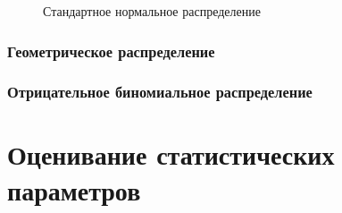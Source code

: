\documentclass[
  letterpaper,
  DIV=11,
  numbers=noendperiod]{scrreprt}
\newcommand{\const}{\text{const}}
\newcommand{\lp}{\left(}
\newcommand{\rp}{\right)}
\newcommand{\lb}{\left[}
\newcommand{\rb}{\right]}
\newcommand*\circled[1]{\tikz[baseline=(char.base)]{
            \node[shape=circle,draw,inner sep=2pt] (char) {#1};}}
\newcommand{\xor}{\,\text{XOR}\,}
\newcommand{\setN}{\mathbb{N}}
\newcommand{\setNo}{\mathbb{N}_{0}}
\newcommand{\setZ}{\mathbb{Z}}
\newcommand{\setQ}{\mathbb{Q}}
\newcommand{\setR}{\mathbb{R}}
\newcommand{\setC}{\mathbb{C}}
\newcommand{\vm}[1]{\mathbf{#1}} %
\newcommand{\prob}{\mathbb{P}}
\newcommand{\expect}{\mathbb{E}}
\newcommand{\disp}{\mathbb{D}}
\newcommand{\var}{\mathrm{var}}
\newcommand{\cov}{\mathrm{cov}}
\newcommand{\cor}{\mathrm{cor}}
\newcommand{\se}{\mathrm{se}}
\newcommand{\sd}{\mathrm{sd}}
\newcommand{\iid}{\text{i.i.d}}
\newcommand{\Cline}[2][red]{{\sbox\MBox{$#2$}%
  \rlap{\usebox\MBox}\color{#1}\rule[-1.2\dp\MBox]{\wd\MBox}{0.5pt}}}
\theoremstyle{definition}
\theoremstyle{remark}
\begin{document}
\begin{figure}


\caption{\label{fig-stnorm}Стандартное нормальное распределение}

\end{figure}%

\subsection{Геометрическое распределение}\label{stats-rand-values-geom}

\subsection{Отрицательное биномиальное
распределение}\label{stats-rand-values-negbinom}


\chapter{Оценивание статистических параметров}\label{stats-estim}

\usepackage{xcolor}
\usepackage{soul}
\usepackage{amsmath, amsfonts}

\newcommand{\const}{\text{const}}
\newcommand{\lp}{\left(}
\newcommand{\rp}{\right)}
\newcommand{\lb}{\left[}
\newcommand{\rb}{\right]}

\newcommand*\circled[1]{\tikz[baseline=(char.base)]{
            \node[shape=circle,draw,inner sep=2pt] (char) {#1};}}

\newcommand{\xor}{\,\text{XOR}\,}

\newcommand{\setN}{\mathbb{N}}
\newcommand{\setNo}{\mathbb{N}_{0}}
\newcommand{\setZ}{\mathbb{Z}}
\newcommand{\setQ}{\mathbb{Q}}
\newcommand{\setR}{\mathbb{R}}
\newcommand{\setC}{\mathbb{C}}

\newcommand{\vm}[1]{\mathbf{#1}}

\newcommand{\Falg}{\mathcal{F}}
\newcommand{\prob}{\mathbb{P}}
\newcommand{\expect}{\mathbb{E}}
\newcommand{\disp}{\mathbb{D}}
\newcommand{\var}{\text{var}}
\newcommand{\cov}{\text{cov}}
\newcommand{\cor}{\text{cor}}
\newcommand{\se}{\text{se}}
\newcommand{\sd}{\text{sd}}
\newcommand{\iid}{\text{i.i.d}}

\newsavebox{\MBox}
\newcommand{\Cline}[2][red]{{\sbox\MBox{$#2$}%
  \rlap{\usebox\MBox}\color{#1}\rule[-1.2\dp\MBox]{\wd\MBox}{0.5pt}}}
\end{document}
